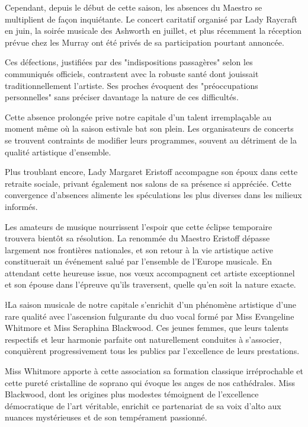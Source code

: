 \documentclass{news}
\begin{document}
Cependant, depuis le début de cette saison, les absences du Maestro se multiplient de façon inquiétante. Le concert caritatif organisé par Lady Raycraft en juin, la soirée musicale des Ashworth en juillet, et plus récemment la réception prévue chez les Murray ont été privés de sa participation pourtant annoncée.

Ces défections, justifiées par des "indispositions passagères" selon les communiqués officiels, contrastent avec la robuste santé dont jouissait traditionnellement l'artiste. Ses proches évoquent des "préoccupations personnelles" sans préciser davantage la nature de ces difficultés.

Cette absence prolongée prive notre capitale d'un talent irremplaçable au moment même où la saison estivale bat son plein. Les organisateurs de concerts se trouvent contraints de modifier leurs programmes, souvent au détriment de la qualité artistique d'ensemble.

Plus troublant encore, Lady Margaret Eristoff accompagne son époux dans cette retraite sociale, privant également nos salons de sa présence si appréciée. Cette convergence d'absences alimente les spéculations les plus diverses dans les milieux informés.

Les amateurs de musique nourrissent l'espoir que cette éclipse temporaire trouvera bientôt sa résolution. La renommée du Maestro Eristoff dépasse largement nos frontières nationales, et son retour à la vie artistique active constituerait un événement salué par l'ensemble de l'Europe musicale.
En attendant cette heureuse issue, nos vœux accompagnent cet artiste exceptionnel et son épouse dans l'épreuve qu'ils traversent, quelle qu'en soit la nature exacte.

\l{L}a saison musicale de notre capitale s'enrichit d'un phénomène artistique d'une rare qualité avec l'ascension fulgurante du duo vocal formé par Miss Evangeline Whitmore et Miss Seraphina Blackwood. Ces jeunes femmes, que leurs talents respectifs et leur harmonie parfaite ont naturellement conduites à s'associer, conquièrent progressivement tous les publics par l'excellence de leurs prestations.

Miss Whitmore apporte à cette association sa formation classique irréprochable et cette pureté cristalline de soprano qui évoque les anges de nos cathédrales. Miss Blackwood, dont les origines plus modestes témoignent de l'excellence démocratique de l'art véritable, enrichit ce partenariat de sa voix d'alto aux nuances mystérieuses et de son tempérament passionné.
\end{document}
